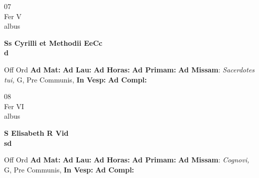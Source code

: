 \documentclass[10pt, openany]{book}
\begin{document}
        \begin{center}
            \begin{minipage}{3.5in}
                \vspace{2em}
                \begin{minipage}{0.5in}
                    {\Huge 07} \\
                    {\normalsize Fer V} \\
                    {\normalsize albus}
                \end{minipage}
                \begin{minipage}{3.0in}
                    \textbf{ \large Ss Cyrilli et Methodii EeCc \\
                    \textnormal{\normalsize d}} \\ 
                \end{minipage}
                \begin{justify}Off Ord
                    \textbf{Ad Mat: }
                    \textbf{Ad Lau: }
                    \textbf{Ad Horas: }
                    \textbf{Ad Primam: }\textbf{Ad Missam}: \textit{Sacerdotes tui,} G, Pre Communis,  
                    \textbf{In Vesp: }
                    \textbf{Ad Compl: }
                \end{justify}
            \end{minipage}
        \end{center}
    
        \begin{center}
            \begin{minipage}{3.5in}
                \vspace{2em}
                \begin{minipage}{0.5in}
                    {\Huge 08} \\
                    {\normalsize Fer VI} \\
                    {\normalsize albus}
                \end{minipage}
                \begin{minipage}{3.0in}
                    \textbf{ \large S Elisabeth R Vid \\
                    \textnormal{\normalsize sd}} \\ 
                \end{minipage}
                \begin{justify}Off Ord
                    \textbf{Ad Mat: }
                    \textbf{Ad Lau: }
                    \textbf{Ad Horas: }
                    \textbf{Ad Primam: }\textbf{Ad Missam}: \textit{Cognovi,} G, Pre Communis,  
                    \textbf{In Vesp: }
                    \textbf{Ad Compl: }
                \end{justify}
            \end{minipage}
        \end{center}
    
\end{document}
